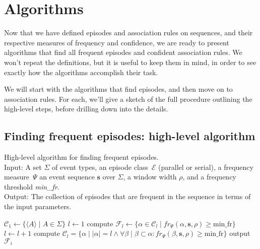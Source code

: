 \chapter{Algorithms}
\label{sec:algorithms}

Now that we have defined episodes and association rules on sequences, and their respective measures of frequency and confidence, we are ready to present algorithms that find all frequent episodes and confident association rules. We won't repeat the definitions, but it is useful to keep them in mind, in order to see exactly how the algorithms accomplish their task.

We will start with the algorithms that find episodes, and then move on to association rules. For each, we'll give a sketch of the full procedure outlining the high-level steps, before drilling down into the details.

\section{Finding frequent episodes: high-level algorithm}

\begin{algorithm}

\caption{High-level algorithm for finding frequent episodes. \\
Input: A set $ \Sigma $ of event types, an episode class~$ \mathcal{E} $ (parallel or serial), a frequency measure~$ \Psi $ an event sequence $ \boldsymbol{s} $ over $ \Sigma $, a window width $ \rho $, and a frequency threshold \emph{min\_fr}. \\
Output: The collection of episodes that are frequent in the sequence in terms of the input parameters.
}

\begin{algorithmic}[1]

\State $ \mathcal{C}_1 \gets \{ \langle A \rangle \mid A \in \Sigma \} $
\State $ l \gets 1 $
    \State compute $ \mathcal{F}_l \gets \{ \alpha \in \mathcal{C}_l \mid fr_\Psi(\alpha, \boldsymbol{s}, \rho) \geq \text{min\_fr} \} $
    \State $ l \gets l + 1 $
    \State compute $ \mathcal{C}_l = \{ \alpha \mid | \alpha | = l \wedge \forall \beta \mid \beta \subset \alpha : fr_\Psi(\beta, \boldsymbol{s}, \rho) \geq \text{min\_fr} \} $
\EndWhile
{}
    \State output $ \mathcal{F}_i $
\EndFor

\end{algorithmic}

\label{alg:episodes-top-level}
\end{algorithm}

